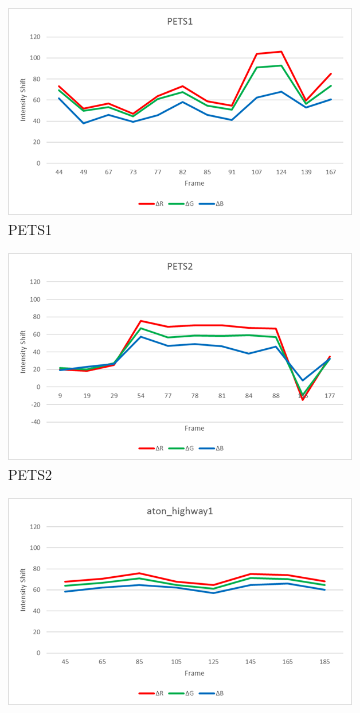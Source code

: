 \begin{figure}
  \centering
  \begin{subfigure}{.49\linewidth}
  \includegraphics[width=1\linewidth]{figures/rgshift_pets1.jpg}
  \caption{PETS1}
\end{subfigure}
\hfill
\begin{subfigure}{.49\linewidth}
  \includegraphics[width=1\linewidth]{figures/rgshift_pets2.jpg}
  \caption{PETS2}
\end{subfigure}
\hfill
\begin{subfigure}{.49\linewidth}
  \includegraphics[width=1\linewidth]{figures/rgshift_highway1.jpg}

\end{subfigure}
\end{figure}

